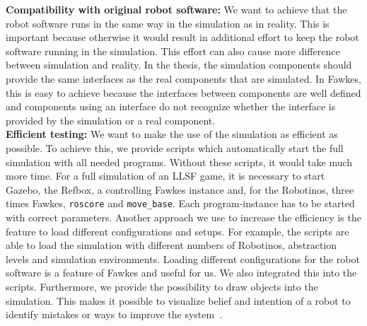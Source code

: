 \textbf{Compatibility with original robot software:} We want to achieve that the robot software runs in the same way in the simulation as in reality. This is important because otherwise it would result in additional effort to keep the robot software running in the simulation. This effort can also cause more difference between simulation and reality. In the thesis, the simulation components should provide the same interfaces as the real components that are simulated. In Fawkes, this is easy to achieve because the interfaces between components are well defined and components using an interface do not recognize whether the interface is provided by the simulation or a real component.\\
\textbf{Efficient testing:} We want to make the use of the simulation as efficient as possible. To achieve this, we provide scripts which automatically start the full simulation with all needed programs. Without these scripts, it would take much more time. For a full simulation of an LLSF game, it is necessary to start Gazebo, the Refbox, a controlling Fawkes instance and, for the Robotinos, three times Fawkes, \texttt{roscore} and \texttt{move\_base}. Each program-instance has to be started with correct parameters.  Another approach we use to increase the efficiency is the feature to load different configurations and setups. For example, the scripts are able to load the simulation with different numbers of Robotinos, abstraction levels and simulation environments. Loading different configurations for the robot software is a feature of Fawkes and useful for us. We also integrated this into the scripts. Furthermore, we provide the possibility to draw objects into the simulation. This makes it possible to visualize belief and intention of a robot to identify mistakes or ways to improve the system~\cite{Visualization}.\\
